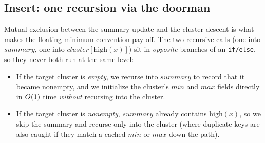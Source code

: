 \subsection{Insert: one recursion via the doorman}

\begin{algorithm}[H]
\caption{\textsc{vEB-Insert}($V, x$)}
\end{algorithm}

Mutual exclusion between the summary update and the cluster descent is what
makes the floating-minimum convention pay off. The two recursive
calls (one into $\mathit{summary}$, one into $\mathit{cluster}[\mathrm{high}(x)]$) sit in \emph{opposite}
branches of an \texttt{if/else}, so they never both run at the same level:

\begin{itemize}
  \item If the target cluster is \emph{empty}, we recurse into $\mathit{summary}$ to
        record that it became nonempty, and we initialize the cluster's $\mathit{min}$ and $\mathit{max}$ fields directly in $O(1)$ time \emph{without} recursing into the cluster.
  \item If the target cluster is \emph{nonempty}, $\mathit{summary}$ already contains $\mathrm{high}(x)$, so we skip the summary and recurse only into the cluster (where duplicate keys are also caught if they match a cached $\mathit{min}$ or $\mathit{max}$ down the path).
\end{itemize}

